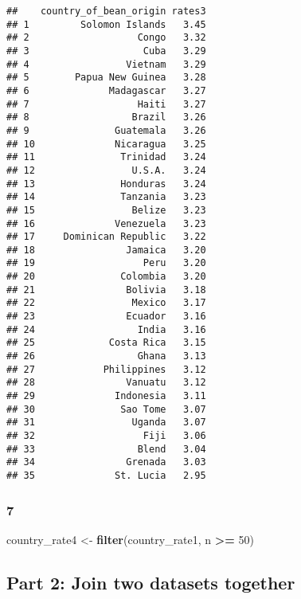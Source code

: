 \documentclass[
]{article}
\newenvironment{Shaded}{\begin{snugshade}}{\end{snugshade}}
\newcommand{\DecValTok}[1]{\textcolor[rgb]{0.00,0.00,0.81}{#1}}
\newcommand{\FunctionTok}[1]{\textcolor[rgb]{0.13,0.29,0.53}{\textbf{#1}}}
\newcommand{\NormalTok}[1]{#1}
\newcommand{\OtherTok}[1]{\textcolor[rgb]{0.56,0.35,0.01}{#1}}
\newcommand{\SpecialCharTok}[1]{\textcolor[rgb]{0.81,0.36,0.00}{\textbf{#1}}}
\begin{document}
\begin{verbatim}
##    country_of_bean_origin rates3
## 1         Solomon Islands   3.45
## 2                   Congo   3.32
## 3                    Cuba   3.29
## 4                 Vietnam   3.29
## 5        Papua New Guinea   3.28
## 6              Madagascar   3.27
## 7                   Haiti   3.27
## 8                  Brazil   3.26
## 9               Guatemala   3.26
## 10              Nicaragua   3.25
## 11               Trinidad   3.24
## 12                 U.S.A.   3.24
## 13               Honduras   3.24
## 14               Tanzania   3.23
## 15                 Belize   3.23
## 16              Venezuela   3.23
## 17     Dominican Republic   3.22
## 18                Jamaica   3.20
## 19                   Peru   3.20
## 20               Colombia   3.20
## 21                Bolivia   3.18
## 22                 Mexico   3.17
## 23                Ecuador   3.16
## 24                  India   3.16
## 25             Costa Rica   3.15
## 26                  Ghana   3.13
## 27            Philippines   3.12
## 28                Vanuatu   3.12
## 29              Indonesia   3.11
## 30               Sao Tome   3.07
## 31                 Uganda   3.07
## 32                   Fiji   3.06
## 33                  Blend   3.04
## 34                Grenada   3.03
## 35              St. Lucia   2.95
\end{verbatim}

\hypertarget{section-5}{%
\subsubsection{7}\label{section-5}}

\begin{Shaded}
\begin{Highlighting}[]
\NormalTok{country\_rate4 }\OtherTok{\textless{}{-}} \FunctionTok{filter}\NormalTok{(country\_rate1, n }\SpecialCharTok{\textgreater{}=} \DecValTok{50}\NormalTok{) }
\end{Highlighting}
\end{Shaded}

\hypertarget{part-2-join-two-datasets-together}{%
\subsection{Part 2: Join two datasets
together}\label{part-2-join-two-datasets-together}}
\end{document}
